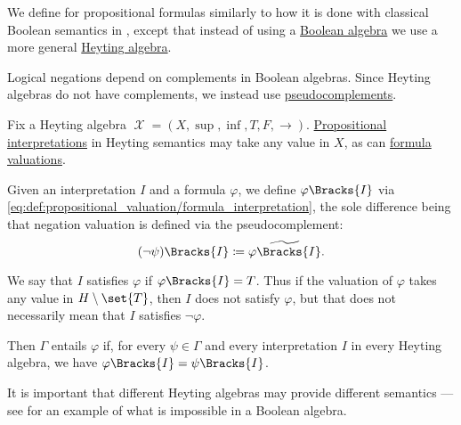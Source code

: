 \begin{definition}\label{def:propositional_heyting_algebra_semantics}
  We define  for propositional formulas similarly to how it is done with classical Boolean semantics in , except that instead of using a \hyperref[def:boolean_algebra]{Boolean algebra} we use a more general \hyperref[def:heyting_algebra]{Heyting algebra}.

  Logical negations depend on complements in Boolean algebras. Since Heyting algebras do not have complements, we instead use \hyperref[def:heyting_algebra/pseudocomplement]{pseudocomplements}.

  Fix a Heyting algebra \( \mscrX = (X, \sup, \inf, T, F, \rightarrow) \). \hyperref[def:propositional_valuation/interpretation]{Propositional interpretations} in Heyting semantics may take any value in \( X \), as can \hyperref[def:propositional_valuation/formula_valuation]{formula valuations}.

  Given an interpretation \( I \) and a formula \( \varphi \), we define \( \varphi\Bracks{I} \) via \eqref{eq:def:propositional_valuation/formula_interpretation}, the sole difference being that negation valuation is defined via the pseudocomplement:
  \begin{equation*}
    (\neg \psi)\Bracks{I} \coloneqq \widetilde{\varphi\Bracks{I}}.
  \end{equation*}

  We say that \( I \) satisfies \( \varphi \) if \( \varphi\Bracks{I} = T \). Thus if the valuation of \( \varphi \) takes any value in \( H \setminus \set{ T } \), then \( I \) does not satisfy \( \varphi \), but that does not necessarily mean that \( I \) satisfies \( \neg \varphi \).

  Then \( \Gamma \) entails \( \varphi \) if, for every \( \psi \in \Gamma \) and every interpretation \( I \) in every Heyting algebra, we have \( \varphi\Bracks{I} = \psi\Bracks{I} \).

  It is important that different Heyting algebras may provide different semantics --- see  for an example of what is impossible in a Boolean algebra.
\end{definition}

